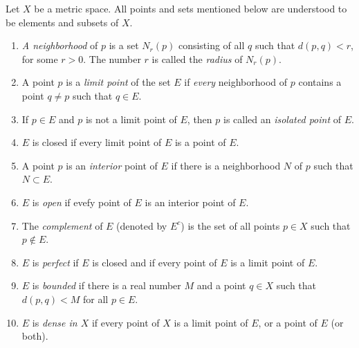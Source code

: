 \begin{definition}
    Let $X$ be a metric space. All points and sets mentioned below are understood to be elements and subsets of $X$.
\begin{enumerate}
\item[(a)] \emph{A neighborhood} of $p$ is a set $N_r(p)$ consisting of all $q$ such that $d(p,q)<r$, for some $r>0$.
The number $r$ is called the \emph{radius} of $N_r(p)$.
\item[(b)] A point $p$ is a \emph{limit point} of the set $E$ if \emph{every} neighborhood of $p$ contains a point $q \neq p$ such that $q \in E$.
\item[(c)] If $p \in E$ and $p$ is not a limit point of $E$, then $p$ is called an \emph{isolated point} of $E$.
\item[(d)] $E$ is closed if every limit point of $E$ is a point of $E$.
\item[(e)] A point $p$ is an \emph{interior} point of $E$ if there is a neighborhood $N$ of $p$ such that $N \subset E$.
\item[(f)] $E$ is \emph{open} if evefy point of $E$ is an interior point of $E$.
\item[(g)] The \emph{complement} of $E$ (denoted by $E^c$) is the set of all points $p \in X$ such that $p \notin E$.
\item[(h)] $E$ is \emph{perfect} if $E$ is closed and if every point of $E$ is a limit point of $E$.
\item[(i)] $E$ is \emph{bounded} if there is a real number $M$ and a point $q \in X$ such that $d(p,q)<M$ for all $p \in E$.    
\item[(j)] $E$ is \emph{dense in $X$} if every point of $X$ is a limit point of $E$, or a point of $E$ (or both).
\end{enumerate}
\end{definition}
